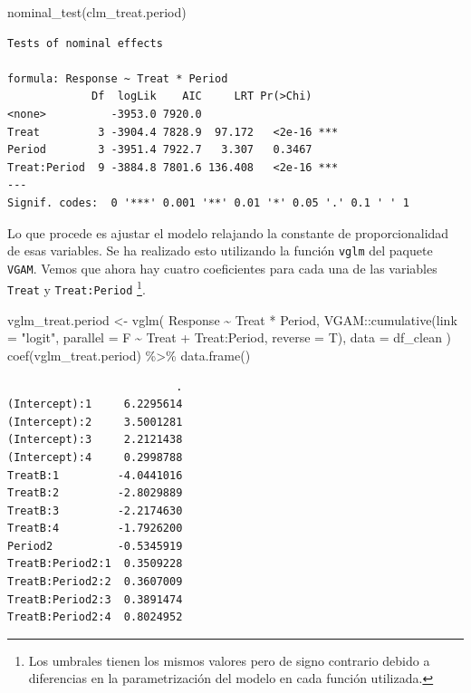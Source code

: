 \documentclass[
  12pt,
  a4paper,
  extrafontsizes,
  onecolumn,
  openright]{memoir}
\newenvironment{Shaded}{\begin{snugshade}}{\end{snugshade}}
\newcommand{\AttributeTok}[1]{\textcolor[rgb]{0.40,0.45,0.13}{#1}}
\newcommand{\FunctionTok}[1]{\textcolor[rgb]{0.28,0.35,0.67}{#1}}
\newcommand{\NormalTok}[1]{\textcolor[rgb]{0.00,0.23,0.31}{#1}}
\newcommand{\OtherTok}[1]{\textcolor[rgb]{0.00,0.23,0.31}{#1}}
\newcommand{\SpecialCharTok}[1]{\textcolor[rgb]{0.37,0.37,0.37}{#1}}
\newcommand{\StringTok}[1]{\textcolor[rgb]{0.13,0.47,0.30}{#1}}
\begin{document}
\scriptsize

\begin{Shaded}
\begin{Highlighting}[]
\FunctionTok{nominal\_test}\NormalTok{(clm\_treat.period)}
\end{Highlighting}
\end{Shaded}

\begin{verbatim}
Tests of nominal effects

formula: Response ~ Treat * Period
             Df  logLik    AIC     LRT Pr(>Chi)    
<none>          -3953.0 7920.0                     
Treat         3 -3904.4 7828.9  97.172   <2e-16 ***
Period        3 -3951.4 7922.7   3.307   0.3467    
Treat:Period  9 -3884.8 7801.6 136.408   <2e-16 ***
---
Signif. codes:  0 '***' 0.001 '**' 0.01 '*' 0.05 '.' 0.1 ' ' 1
\end{verbatim}

\normalsize

Lo que procede es ajustar el modelo relajando la constante de
proporcionalidad de esas variables. Se ha realizado esto utilizando la
función \texttt{vglm} del paquete \texttt{VGAM}. Vemos que ahora hay
cuatro coeficientes para cada una de las variables \texttt{Treat} y
\texttt{Treat:Period} \footnote{Los umbrales tienen los mismos valores
  pero de signo contrario debido a diferencias en la parametrización del
  modelo en cada función utilizada.}.

\scriptsize

\begin{Shaded}
\begin{Highlighting}[]
\NormalTok{vglm\_treat.period }\OtherTok{\textless{}{-}} \FunctionTok{vglm}\NormalTok{(}
\NormalTok{    Response }\SpecialCharTok{\textasciitilde{}}\NormalTok{ Treat }\SpecialCharTok{*}\NormalTok{ Period,}
\NormalTok{    VGAM}\SpecialCharTok{::}\FunctionTok{cumulative}\NormalTok{(}\AttributeTok{link =} \StringTok{"logit"}\NormalTok{, }\AttributeTok{parallel =}\NormalTok{ F }\SpecialCharTok{\textasciitilde{}}\NormalTok{ Treat }\SpecialCharTok{+}\NormalTok{ Treat}\SpecialCharTok{:}\NormalTok{Period, }\AttributeTok{reverse =}\NormalTok{ T),}
    \AttributeTok{data =}\NormalTok{ df\_clean}
\NormalTok{)}
\FunctionTok{coef}\NormalTok{(vglm\_treat.period) }\SpecialCharTok{\%\textgreater{}\%} \FunctionTok{data.frame}\NormalTok{()}
\end{Highlighting}
\end{Shaded}

\begin{verbatim}
                          .
(Intercept):1     6.2295614
(Intercept):2     3.5001281
(Intercept):3     2.2121438
(Intercept):4     0.2998788
TreatB:1         -4.0441016
TreatB:2         -2.8029889
TreatB:3         -2.2174630
TreatB:4         -1.7926200
Period2          -0.5345919
TreatB:Period2:1  0.3509228
TreatB:Period2:2  0.3607009
TreatB:Period2:3  0.3891474
TreatB:Period2:4  0.8024952
\end{verbatim}
\end{document}
